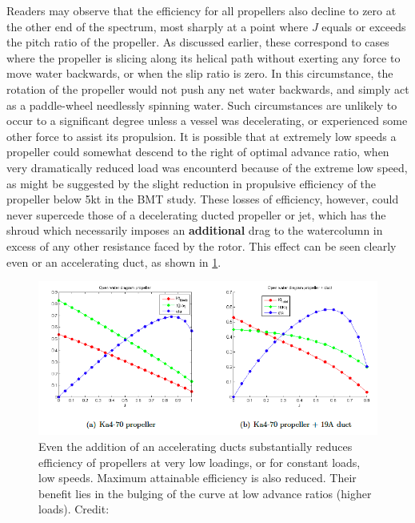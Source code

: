 \documentclass{article}\usepackage[]{graphicx}\usepackage[]{color}
\begin{document}
Readers may observe that the efficiency for all propellers also decline to zero at the other end of the spectrum, most sharply at a point where $J$ equals or exceeds the pitch ratio of the propeller.  As discussed earlier, these correspond to cases where the propeller is slicing along its helical path without exerting any force to move water backwards, or when the slip ratio is zero.  In this circumstance, the rotation of the propeller would not push any net water backwards, and simply act as a paddle-wheel needlessly spinning water.  Such circumstances are unlikely to occur to a significant degree unless a vessel was decelerating, or experienced some other force to assist its propulsion.  It is possible that at extremely low speeds a propeller could somewhat descend to the right of optimal advance ratio, when very dramatically reduced load was encounterd because of the extreme low speed, as might be suggested by the slight reduction in propulsive efficiency of the propeller below 5kt in the BMT study.  These losses of efficiency, however, could never supercede those of a decelerating ducted propeller or jet, which has the shroud which necessarily imposes an \textbf{additional} drag to the watercolumn in excess of any other resistance faced by the rotor.  This effect can be seen clearly even or an accelerating duct, as shown in \ref{fig:PropDuct.png}.

\begin{figure}[h] \captionsetup{width=0.5\textwidth}
\includegraphics[width=\textwidth]{PropDuct.png}
\caption{Even the addition of an accelerating ducts substantially reduces efficiency of propellers at very low loadings, or for constant loads, low speeds.  Maximum attainable efficiency is also reduced. Their benefit lies in the bulging of the curve at low advance ratios (higher loads).  Credit: \cite[6]{willemsen2013}}
\label{fig:PropDuct.png}
\end{figure}
\end{document}
